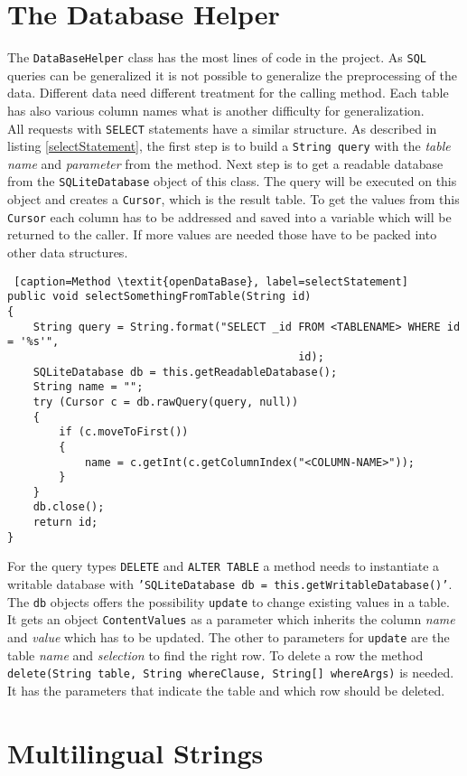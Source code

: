 \section{The Database Helper}

The \texttt{DataBaseHelper} class has the most lines of code in the project. As \texttt{SQL} queries can be generalized it is not possible to generalize the preprocessing of the data. Different data need different treatment for the calling method. Each table has also various column names what is another difficulty for generalization. \\
All requests with \texttt{SELECT} statements have a similar structure. As described in listing \ref{selectStatement}, the first step is to build a \texttt{String query} with the \textit{table name} and \textit{parameter} from the method. Next step is to get a readable database from the \texttt{SQLiteDatabase} object of this class. The query will be executed on this object and creates a \texttt{Cursor}, which is the result table. To get the values from this \texttt{Cursor} each column has to be addressed and saved into a variable which will be returned to the caller. If more values are needed those have to be packed into other data structures.
\begin{lstlisting} [caption=Method \textit{openDataBase}, label=selectStatement] 
public void selectSomethingFromTable(String id)
{
	String query = String.format("SELECT _id FROM <TABLENAME> WHERE id = '%s'",
											 id);
	SQLiteDatabase db = this.getReadableDatabase();
	String name = "";
	try (Cursor c = db.rawQuery(query, null))
	{
		if (c.moveToFirst())
		{
			name = c.getInt(c.getColumnIndex("<COLUMN-NAME>"));
		}
	}
	db.close();
	return id;
}
\end{lstlisting}
For the query types \texttt{DELETE} and \texttt{ALTER TABLE} a method needs to instantiate a writable database with \texttt{'SQLiteDatabase db = this.getWritableDatabase()'}. The \texttt{db} objects offers the possibility \texttt{update} to change existing values in a table. It gets an object \texttt{ContentValues} as a parameter which inherits the column \textit{name} and \textit{value} which has to be updated. The other to parameters for \texttt{update} are the table \textit{name} and \textit{selection} to find the right row. To delete a row the method \texttt{delete(String table, String whereClause, String[] whereArgs)} is needed. It has the parameters that indicate the table and which row should be deleted.

\section{Multilingual Strings}

